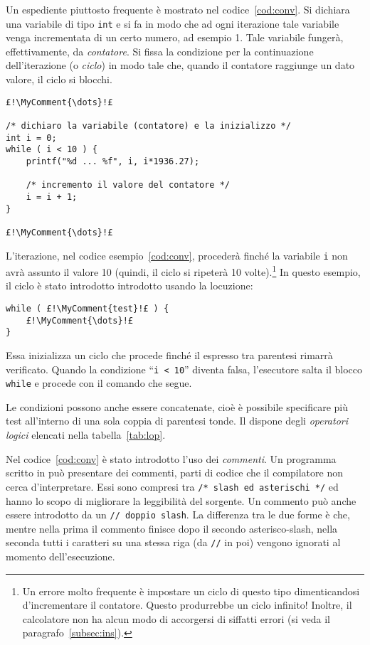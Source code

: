 Un espediente piuttosto frequente è mostrato nel codice~\vref{cod:conv}.
Si dichiara una variabile di tipo \lstinline!int! e si fa in modo che ad ogni iterazione tale variabile venga incrementata di un certo numero, ad esempio \num{1}.
Tale  variabile fungerà, effettivamente, da \emph{contatore}. Si fissa la condizione per la continuazione dell'iterazione (o \emph{ciclo}) in modo tale che, quando il contatore raggiunge un dato valore, il ciclo si blocchi.
\begin{lstlisting}[caption={{\em Tabella di conversione Euro/Lira.}}, label={cod:conv}]
£!\MyComment{\dots}!£

/* dichiaro la variabile (contatore) e la inizializzo */
int i = 0; 
while ( i < 10 ) {
	printf("%d ... %f", i, i*1936.27);

	/* incremento il valore del contatore */
	i = i + 1; 
}

£!\MyComment{\dots}!£
\end{lstlisting}
L'iterazione, nel codice esempio~\ref{cod:conv}, procederà finché la variabile \lstinline!i! non avrà assunto il valore \num{10} (quindi, il ciclo si ripeterà \num{10} volte).\footnote{Un errore molto frequente è impostare un ciclo di questo tipo dimenticandosi d'incrementare il contatore. Questo produrrebbe un ciclo infinito! Inoltre, il calcolatore non ha alcun modo di accorgersi di siffatti errori (si veda il paragrafo~\ref{subsec:ins}).}
In questo esempio, il ciclo è stato introdotto introdotto usando la locuzione:
\begin{lstlisting}
while ( £!\MyComment{test}!£ ) {
	£!\MyComment{\dots}!£
}
\end{lstlisting}
Essa inizializza un ciclo che  procede finché il  espresso tra parentesi rimarrà verificato. Quando la condizione ``\lstinline!i < 10!'' diventa falsa, l'esecutore salta il blocco \lstinline!while! e procede con il comando che segue.

Le condizioni possono anche essere concatenate, cioè è possibile specificare più test all'interno di una sola coppia di parentesi tonde. Il  dispone degli \emph{operatori logici} elencati nella tabella~\ref{tab:lop}.


Nel codice~\ref{cod:conv} è stato introdotto l'uso dei \emph{commenti}.
Un programma scritto in  può presentare dei commenti, parti di codice che il compilatore non cerca d'interpretare.
Essi sono compresi tra \lstinline!/* slash ed asterischi */! ed hanno lo scopo di migliorare la leggibilità del sorgente.
Un commento può anche essere introdotto da un \lstinline!// doppio slash!.
La differenza tra le due forme è che, mentre nella prima il commento finisce dopo il secondo asterisco-slash, nella seconda tutti i caratteri su una stessa riga (da \lstinline!//! in poi) vengono ignorati al momento dell'esecuzione.

